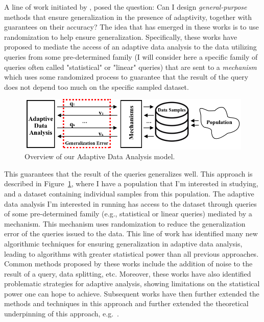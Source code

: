 A line of work initiated by \cite{DworkFHPRR15}, \cite{HardtU14} posed the question: Can I design \emph{general-purpose} methods that ensure generalization in the presence of adaptivity, together with guarantees on their accuracy? 
The idea that has emerged in these works is to use randomization to help ensure generalization. 
Specifically, these works have proposed to mediate the access of an adaptive data analysis to the data utilizing queries from some pre-determined family (I will consider here a specific family of queries often called "statistical" or "linear" queries) that are sent to a 
\emph{mechanism} which uses some randomized process to guarantee that the result of the query does not depend too much on the specific
sampled dataset. 
%
\begin{figure}
 \centering
 \includegraphics[width=0.7\columnwidth]{figures/data_analysis_model.png}
 \caption{Overview of our Adaptive Data Analysis model.}
 \label{fig:adaptivity-model-overview}
\vspace{-0.5cm}
\end{figure}
This guarantees that the result of the queries generalizes well. 
This approach is described in Figure~\ref{fig:adaptivity-model-overview}, where
I have a population that I'm interested in studying, and a dataset containing individual samples from this population. The adaptive data analysis I'm interested in running has access to the dataset through queries of some pre-determined family (e.g., statistical or linear queries) mediated by a mechanism. 
This mechanism uses randomization to reduce the generalization error of the queries issued to the data.
This line of work has identified many new algorithmic techniques for ensuring generalization in adaptive data analysis, leading to algorithms with greater statistical power than all previous approaches. 
Common methods proposed by these works include the addition of noise to the result of a query, data splitting, etc. 
Moreover, these works have also identified problematic strategies for adaptive analysis, showing limitations on the statistical power one can hope to achieve. 
Subsequent works have then further extended the methods and techniques in this approach and further extended the theoretical underpinning of this approach, 
e.g.~\cite{dwork2015reusable,dwork2015generalization,BassilyNSSSU16,UllmanSNSS18,FeldmanS17,jung2019new,SteinkeZ20,RogersRSSTW20}.
%

